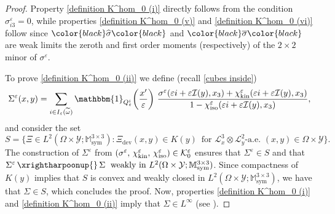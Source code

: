 \documentclass[reqno,10pt]{amsart}
\numberwithin{equation}{section}
\theoremstyle{remark}
\newcommand{\BLACK}{\color{black}}
\newcommand{\PINK}{\color{black}}
\newcommand{\calI}{\mathcal{I}}
\newcommand{\calK}{\mathcal{K}}
\newcommand{\calL}{\mathcal{L}}
\newcommand{\M}{\mathbb{M}}
\newcommand{\calY}{\mathcal{Y}}
\DeclareMathOperator{\dev}{dev}
\DeclareMathOperator{\sym}{sym}
\newcommand{\weak}{\,\xrightharpoonup{}\,}
\newcommand{\eps}{\varepsilon}
\newcommand{\zerothI}[1]{\overline{#1}}
\newcommand{\firstI}[1]{\widehat{#1}}
\newcommand{\charfun}[1]{\mathbbm{1}_{#1}}
\newcommand{\ext}[1]{\widetilde{#1}}
\newcommand{\chikin}{\chi_{\rm kin}}
\newcommand{\chiiso}{\chi_{\rm iso}}
\begin{document}
\begin{proof}
Property \ref{definition K^hom_0 (i)} directly follows from the condition $\sigma^\eps_{i3} = 0$, while properties \ref{definition K^hom_0 (v)} and \ref{definition K^hom_0 (vi)} follow since ${\PINK\firstI{\sigma}\BLACK}$ and ${\PINK\zerothI{\sigma}\BLACK}$ are weak limits the zeroth and first order moments (respectively) of the $2 \times 2$ minor of $\sigma^\eps$. 

To prove \ref{definition K^hom_0 (ii)} we define (recall \eqref{cubes inside})
\begin{equation*} \label{approximating sequence for K^hom}
	\Sigma^\eps(x,y) = \sum_{i \in I_\eps(\ext{\omega})} \charfun{Q_\eps^i}\!\left(\frac{x'}{\eps}\right)\,\frac{\sigma^\eps(\eps i + \eps\calI(y),x_3)+\chikin^\eps(\eps i + \eps\calI(y),x_3)}{1-\chiiso^\eps(\eps i + \eps\calI(y),x_3)},
\end{equation*}
and consider the set
\begin{equation*}
	S = \{ \Xi \in L^2(\Omega \times \calY;\M^{3 \times 3}_{\sym}) : \Xi_{\dev}(x,y) \in K(y) \,\text{ for } \calL^{3}_{x} \otimes \calL^{2}_{y}\text{-a.e. } (x,y) \in \Omega \times \calY \}.
\end{equation*}
The construction of $\Sigma^\eps$ from $(\sigma^\eps,\, \chikin^\eps,\, \chiiso^\eps) \in \calK^\eps_{0}$ ensures that $\Sigma^\eps \in S$ and that $\Sigma^\eps \weak \Sigma \;\text{ weakly in } L^2(\Omega \times \calY;\M^{3 \times 3}_{\sym})$. 
Since compactness of $K(y)$ implies that $S$ is convex and weakly closed in $L^2(\Omega \times \calY;\M^{3 \times 3}_{\sym})$, we have that $\Sigma \in S$, which concludes the proof.
Now, properties \ref{definition K^hom_0 (i)} and \ref{definition K^hom_0 (ii)} imply that $\Sigma \in L^{\infty}$ (see ).


\end{proof}
\end{document}
